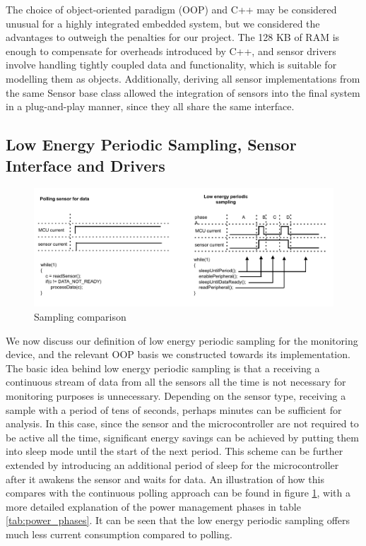 The choice of object-oriented paradigm (OOP) and C++ may be considered unusual for a highly integrated embedded system, but we considered the advantages to outweigh the penalties for our project. The 128 KB of RAM is enough to compensate for overheads introduced by C++, and sensor drivers involve handling tightly coupled data and functionality, which is suitable for modelling them as objects. Additionally, deriving all sensor implementations from the same Sensor base class allowed the integration of sensors into the final system in a plug-and-play manner, since they all share the same interface.



\subsection{Low Energy Periodic Sampling, Sensor Interface and Drivers}
\begin{figure}
\centering
\includegraphics[width=\textwidth]{Images/sampling_comparison}
\caption{Sampling comparison}
\label{fig:sampling_comparison}
\end{figure}
We now discuss our definition of low energy periodic sampling for the monitoring device, and the relevant OOP basis we constructed towards its implementation. The basic idea behind low energy periodic sampling is that a receiving a continuous stream of data from all the sensors all the time is not necessary for monitoring purposes is unnecessary. Depending on the sensor type, receiving a sample with a period of tens of seconds, perhaps minutes can be sufficient for analysis. In this case, since the sensor and the microcontroller are not required to be active all the time, significant energy savings can be achieved by putting them into sleep mode until the start of the next period. This scheme can be further extended by introducing an additional period of sleep for the microcontroller after it awakens the sensor and waits for data. An illustration of how this compares with the continuous polling approach can be found in figure \ref{fig:sampling_comparison}, with a more detailed explanation of the power management phases in table \ref{tab:power_phases}. It can be seen that the low energy periodic sampling offers much less current consumption compared to polling.

